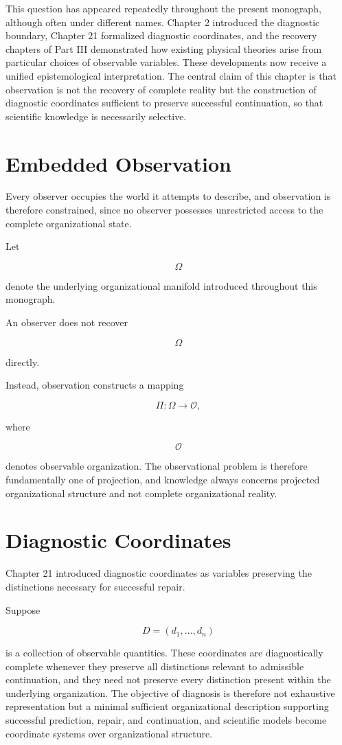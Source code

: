 \documentclass[11pt,oneside]{book}
\numberwithin{equation}{chapter}
\theoremstyle{definition}
\theoremstyle{plain}
\begin{document}
This question has appeared repeatedly throughout the present monograph, although often under different names. Chapter 2 introduced the diagnostic boundary, Chapter 21 formalized diagnostic coordinates, and the recovery chapters of Part III demonstrated how existing physical theories arise from particular choices of observable variables. These developments now receive a unified epistemological interpretation. The central claim of this chapter is that observation is not the recovery of complete reality but the construction of diagnostic coordinates sufficient to preserve successful continuation, so that scientific knowledge is necessarily selective.

\section{Embedded Observation}

Every observer occupies the world it attempts to describe, and observation is therefore constrained, since no observer possesses unrestricted access to the complete organizational state.

Let

\[
\Omega
\]

denote the underlying organizational manifold introduced throughout this
monograph.

An observer does not recover

\[
\Omega
\]

directly.

Instead, observation constructs a mapping

\[
\Pi :
\Omega
\rightarrow
\mathcal O,
\]

where

\[
\mathcal O
\]

denotes observable organization. The observational problem is therefore fundamentally one of projection, and knowledge always concerns projected organizational structure and not complete organizational reality.

\section{Diagnostic Coordinates}

Chapter 21 introduced diagnostic coordinates as variables preserving the
distinctions necessary for successful repair.

Suppose

\[
D
=
(d_1,\ldots,d_n)
\]

is a collection of observable quantities. These coordinates are diagnostically complete whenever they preserve all distinctions relevant to admissible continuation, and they need not preserve every distinction present within the underlying organization. The objective of diagnosis is therefore not exhaustive representation but a minimal sufficient organizational description supporting successful prediction, repair, and continuation, and scientific models become coordinate systems over organizational structure.
\end{document}
